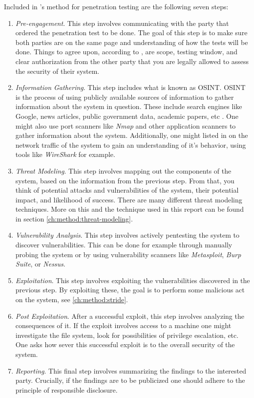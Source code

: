 Included in \citeauthor{weidman2014}'s method for penetration testing are the following seven steps:
\begin{enumerate}
    \item \textit{Pre-engagement}. This step involves communicating with the party that ordered the penetration test to be done. The goal of this step is to make sure both parties are on the same page and understanding of how the tests will be done. Things to agree upon, according to \citeauthor{weidman2014}, are scope, testing window, and clear authorization from the other party that you are legally allowed to assess the security of their system.
    \item \textit{Information Gathering}. This step includes what is known as \gls{OSINT}. \gls{OSINT} is the process of using publicly available sources of information to gather information about the system in question. These include search engines like Google, news articles, public government data, academic papers, etc \cite{steele2007open}. One might also use port scanners like \textit{Nmap} and other application scanners to gather information about the system. Additionally, one might listed in on the network traffic of the system to gain an understanding of it's behavior, using tools like \textit{WireShark} for example.
    \item \textit{Threat Modeling}. This step involves mapping out the components of the system, based on the information from the previous step. From that, you think of potential attacks and vulnerabilities of the system, their potential impact, and likelihood of success. There are many different threat modeling techniques. More on this and the technique used in this report can be found in section \ref{ch:method:threat-modeling}.
    \item \textit{Vulnerability Analysis}. This step involves actively pentesting the system to discover vulnerabilities. This can be done for example through manually probing the system or by using vulnerability scanners like \textit{Metasploit}, \textit{Burp Suite}, or \textit{Nessus}.
    \item \textit{Exploitation}. This step involves exploiting the vulnerabilities discovered in the previous step. By exploiting these, the goal is to perform some malicious act on the system, see \ref{ch:method:stride}.
    \item \textit{Post Exploitation}. After a successful exploit, this step involves analyzing the consequences of it. If the exploit involves access to a machine one might investigate the file system, look for possibilities of privilege escalation, etc. One asks how sever this successful exploit is to the overall security of the system.
    \item \textit{Reporting}. This final step involves summarizing the findings to the interested party. Crucially, if the findings are to be publicized one should adhere to the principle of responsible disclosure.
\end{enumerate}
